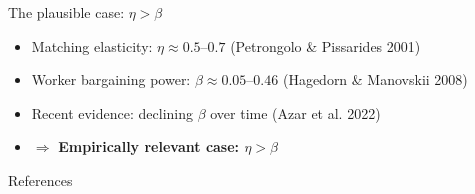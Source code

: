 \documentclass[9pt,xcolor={svgnames}]{beamer}
\begin{document}
\begin{frame}{The plausible case: $\eta > \beta$} \label{app:beta_eta}





\begin{itemize}
\footnotesize 
    \item Matching elasticity: $\eta \approx 0.5$--$0.7$ {\scriptsize (Petrongolo \& Pissarides 2001)}
    
    \item Worker bargaining power: $\beta \approx 0.05$--$0.46$ {\scriptsize (Hagedorn \& Manovskii 2008)}
    
    \item Recent evidence: declining $\beta$ over time {\scriptsize (Azar et al. 2022)}
    
    \item $\Rightarrow$ \textbf{Empirically relevant case: $\eta > \beta$}
\end{itemize}




    

\footnotesize 




  \hyperlink{main:beta_eta}{}


\end{frame}




\begin{frame}{References}
  
\end{frame}
\end{document}
